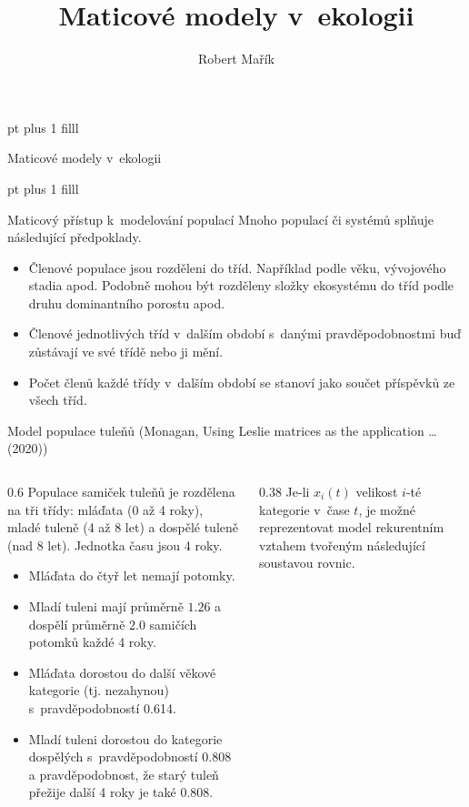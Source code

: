 \documentclass[handouts]{beamer}
\title{Maticové modely v ekologii}
\author{Robert Mařík}
\begin{document}
\begin{frame}

   pt plus 1 filll
  
  \begin{center}
    \large Maticové modely v ekologii
  \end{center}

   pt plus 1 filll


  \begin{block}{Maticový přístup k modelování populací}
    Mnoho populací či systémů splňuje následující předpoklady.
  \begin{itemize}
  \item Členové populace jsou rozděleni do tříd. Například podle věku,
    vývojového stadia apod. Podobně mohou být rozděleny složky
    ekosystému do tříd podle druhu dominantního porostu apod.
  \item Členové jednotlivých tříd v dalším období s danými pravděpodobnostmi buď zůstávají ve své třídě nebo ji mění.
  \item Počet členů každé třídy v dalším období se stanoví jako součet příspěvků ze všech tříd.    
  \end{itemize}
\end{block}

\begin{exampleblock}{Model populace tuleňů (Monagan, Using Leslie matrices as the application \dots (2020))}
  \begin{columns}
    \begin{column}[t]{0.6\hsize}
  Populace samiček tuleňů je rozdělena na tři třídy: mláďata (0 až 4
  roky), mladé tuleně (4 až 8 let) a dospělé tuleně (nad 8
  let). Jednotka času jsou 4 roky.
  \begin{itemize}
  \item Mláďata do čtyř let nemají
  potomky. 
\item Mladí tuleni mají průměrně $1.26$ a dospělí průměrně $2.0$
  samičích potomků každé 4 roky. 
\item Mláďata dorostou do další věkové
  kategorie (tj. nezahynou) s pravděpodobností 0.614. 
\item Mladí tuleni
  dorostou do kategorie dospělých s pravděpodobností 0.808 a
  pravděpodobnost, že starý tuleň přežije další 4 roky je také 0.808.
\end{itemize}

\end{column}
\begin{column}[t]{0.38\hsize}
  Je-li $x_i(t)$ velikost $i$-té kategorie v čase $t$, je možné
  reprezentovat model rekurentním vztahem tvořeným následující
  soustavou rovnic.


\end{column}
\end{columns}
\end{exampleblock}
\end{frame}
\end{document}
